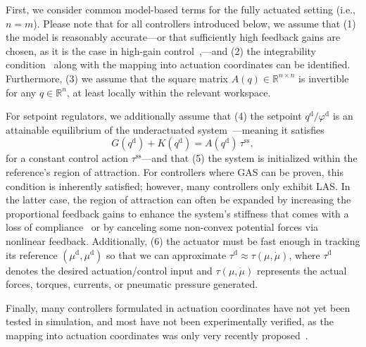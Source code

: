 First, we consider common model-based terms for the fully actuated setting (i.e., $n = m$). Please note that for all controllers introduced below, we assume that (1) the model is reasonably accurate—or that sufficiently high feedback gains are chosen, as it is the case in high-gain control~\citep{marino1985high},—and (2) the integrability condition~\citep{pustina2024input} along with the mapping into actuation coordinates can be identified. Furthermore, (3) we assume that the square matrix $A(q) \in \mathbb{R}^{n \times n}$ is invertible for any $q \in \mathbb{R}^n$, at least locally within the relevant workspace.

For setpoint regulators, we additionally assume that (4) the setpoint $q^\mathrm{d}/\varphi^\mathrm{d}$ is an attainable equilibrium of the underactuated system~\citep{pustina2022feedback}—meaning it satisfies
\begin{equation}
    G(q^\mathrm{d}) + K(q^\mathrm{d}) = A(q^\mathrm{d}) \, \tau^\mathrm{ss},
\end{equation}
for a constant control action $\tau^\mathrm{ss}$—and that (5) the system is initialized within the reference’s region of attraction. For controllers where \gls{GAS} can be proven, this condition is inherently satisfied; however, many controllers only exhibit \gls{LAS}. In the latter case, the region of attraction can often be expanded by increasing the proportional feedback gains to enhance the system’s stiffness that comes with a loss of compliance~\citep{della2017controlling, della2023model} or by canceling some non-convex potential forces via nonlinear feedback. Additionally, (6) the actuator must be fast enough in tracking its reference $(\mu^\mathrm{d}, \mu^\mathrm{d})$ so that we can approximate $\tau^\mathrm{d} \approx \tau(\mu,\dot{\mu})$, where $\tau^\mathrm{d}$ denotes the desired actuation/control input and $\tau(\mu,\dot{\mu})$ represents the actual forces, torques, currents, or pneumatic pressure generated.

Finally, many controllers formulated in actuation coordinates have not yet been tested in simulation, and most have not been experimentally verified, as the mapping into actuation coordinates was only very recently proposed~\citep{pustina2024input}.

